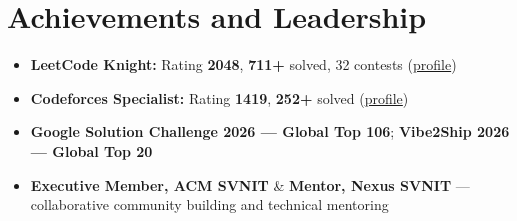 \documentclass[a4paper,10pt]{article}
\begin{document}
\section{Achievements and Leadership}
\small
\begin{itemize}
  \item \textbf{LeetCode Knight:} Rating \textbf{2048}, \textbf{711+} solved, 32 contests (\href{https://leetcode.com/Oju_Srivastava}{profile})
  \item \textbf{Codeforces Specialist:} Rating \textbf{1419}, \textbf{252+} solved (\href{https://codeforces.com/profile/Oju}{profile})
  \item \textbf{Google Solution Challenge 2026 --- Global Top 106}; \textbf{Vibe2Ship 2026 --- Global Top 20}
  \item \textbf{Executive Member, ACM SVNIT} \& \textbf{Mentor, Nexus SVNIT} --- collaborative community building and technical mentoring
\end{itemize}
\end{document}
